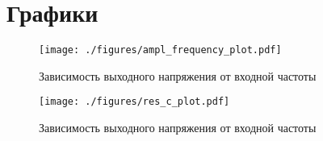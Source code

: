 \section{Графики}

\begin{figure}[H]
	\centering
	\texttt{[image: ./figures/ampl\_frequency\_plot.pdf]}
	\caption{Зависимость выходного напряжения от входной частоты}
	\label{fig:u_f}
\end{figure}

\begin{figure}[H]
	\centering
	\texttt{[image: ./figures/res\_c\_plot.pdf]}
	\caption{Зависимость выходного напряжения от входной частоты}
	\label{fig:res_c}
\end{figure}
